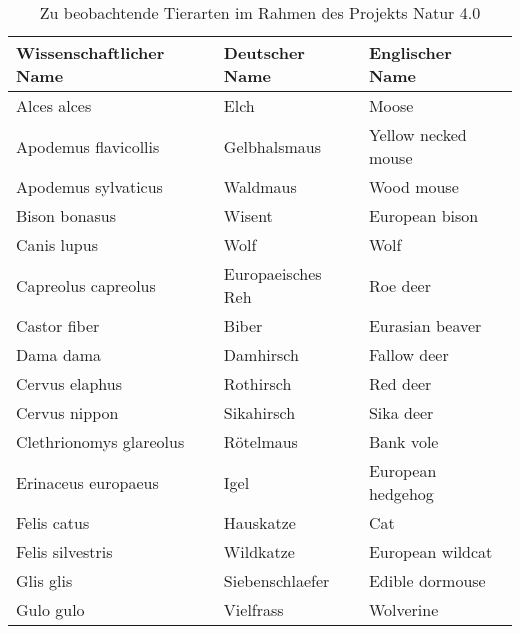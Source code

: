 \chapter{\appendixname}

\begin{table}[!ht]
	\centering
	\caption{Zu beobachtende Tierarten im Rahmen des Projekts Natur 4.0}
	\label{table:photosenseSpecies}
	\begin{tabular}{l|ll}
		\textbf{Wissenschaftlicher Name}  & \textbf{Deutscher Name}              & \textbf{Englischer Name}       \\
		\hline
		Alces alces              & Elch                        & Moose                 \\
		Apodemus flavicollis     & Gelbhalsmaus                & Yellow necked mouse   \\
		Apodemus sylvaticus      & Waldmaus                    & Wood mouse            \\
		Bison bonasus            & Wisent                      & European bison        \\
		Canis lupus              & Wolf                        & Wolf                  \\
		\hline
		Capreolus capreolus      & Europaeisches Reh           & Roe deer              \\
		Castor fiber             & Biber                       & Eurasian beaver       \\
		Dama dama                & Damhirsch                   & Fallow deer           \\
		Cervus elaphus           & Rothirsch                   & Red deer              \\
		Cervus nippon            & Sikahirsch                  & Sika deer             \\
		\hline
		Clethrionomys glareolus  & Rötelmaus                   & Bank vole             \\
		Erinaceus europaeus      & Igel                        & European hedgehog     \\
		Felis catus              & Hauskatze                   & Cat                   \\
		Felis silvestris         & Wildkatze                   & European wildcat      \\
		Glis glis                & Siebenschlaefer             & Edible dormouse       \\
		\hline
		Gulo gulo                & Vielfrass                   & Wolverine             \\

\end{tabular}
\end{table}
